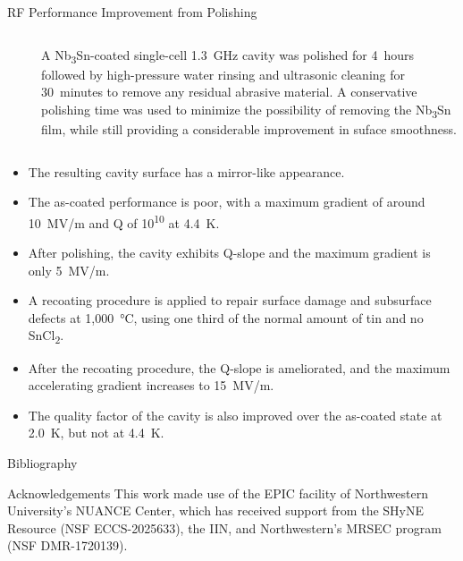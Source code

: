 \documentclass{beamer}
\begin{document}
\begin{frame}{}
\begin{columns}[t]
\begin{column}{0.32\textwidth}
\begin{block}{\label{sec:cavitycbp}RF Performance Improvement from Polishing}
\begin{columns}
\begin{column}{0.55\columnwidth}
\begin{figure}[t]
                            \end{figure}
                        \end{column}
                        \begin{column}{0.4\columnwidth}
                            A Nb\textsubscript{3}Sn-coated single-cell 1.3~GHz cavity was polished for 4~hours followed by high-pressure water rinsing and ultrasonic cleaning for 30~minutes to remove any residual abrasive material. A conservative polishing time was used to minimize the possibility of removing the Nb\textsubscript{3}Sn film, while still providing a considerable improvement in suface smoothness.
                        \end{column}
                    \end{columns}   
                    \begin{itemize}
                        \item The resulting cavity surface has a mirror-like appearance.
                        \item The as-coated performance is poor, with a maximum gradient of around 10~MV/m and Q of 10\textsuperscript{10} at 4.4~K.
                        \item After polishing, the cavity exhibits Q-slope and the maximum gradient is only 5~MV/m.
                        \item A recoating procedure is applied to repair surface damage and subsurface defects at 1,000~°C, using one third of the normal amount of tin and no SnCl\textsubscript{2}.
                        \item After the recoating procedure, the Q-slope is ameliorated, and the maximum accelerating gradient increases to 15~MV/m.
                        \item The quality factor of the cavity is also improved over the as-coated state at 2.0~K, but not at 4.4~K.
                    \end{itemize} 
                \end{block}
                \begin{block}{\label{sec:bibliography}Bibliography}
                    \small
                    
                    
                \end{block}
                \begin{block}{\label{sec:acknowledgements}Acknowledgements}
                    This work made use of the EPIC facility of Northwestern University’s NUANCE Center, which has received support from the SHyNE Resource (NSF ECCS-2025633), the IIN, and Northwestern's MRSEC program (NSF DMR-1720139).


\end{block}
\end{column}
\end{columns}
\end{frame}
\end{document}
